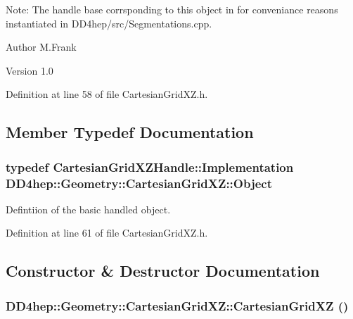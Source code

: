 Note: The handle base corrsponding to this object in for conveniance reasons instantiated in DD4hep/src/Segmentations.cpp.

\begin{DoxyAuthor}{Author}
M.Frank 
\end{DoxyAuthor}
\begin{DoxyVersion}{Version}
1.0 
\end{DoxyVersion}


Definition at line 58 of file CartesianGridXZ.h.

\subsection{Member Typedef Documentation}
\hypertarget{class_d_d4hep_1_1_geometry_1_1_cartesian_grid_x_z_aba1e511c43a8b46f2524a1253c660f10}{
\subsubsection[{Object}]{\setlength{\rightskip}{0pt plus 5cm}typedef {\bf CartesianGridXZHandle::Implementation} {\bf DD4hep::Geometry::CartesianGridXZ::Object}}}
\label{class_d_d4hep_1_1_geometry_1_1_cartesian_grid_x_z_aba1e511c43a8b46f2524a1253c660f10}


Defintiion of the basic handled object. 

Definition at line 61 of file CartesianGridXZ.h.

\subsection{Constructor \& Destructor Documentation}
\hypertarget{class_d_d4hep_1_1_geometry_1_1_cartesian_grid_x_z_a91260b22b34fd4e9c8f1426e60eef7a5}{
\subsubsection[{CartesianGridXZ}]{\setlength{\rightskip}{0pt plus 5cm}DD4hep::Geometry::CartesianGridXZ::CartesianGridXZ ()}}
\label{class_d_d4hep_1_1_geometry_1_1_cartesian_grid_x_z_a91260b22b34fd4e9c8f1426e60eef7a5}


